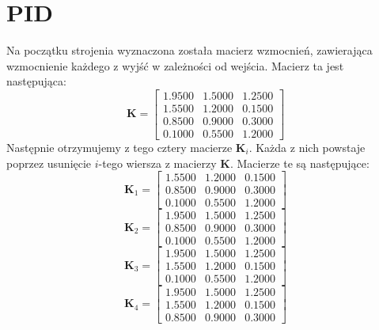 \chapter{PID}
Na początku strojenia wyznaczona została macierz wzmocnień, zawierająca
wzmocnienie każdego z wyjść w zależności od wejścia. Macierz ta jest następująca:
\begin{equation}
  \bm{K} =
  \begin{bmatrix}
    \num{1,9500}  &  \num{1,5000}  &  \num{1,2500} \\
    \num{1,5500}  &  \num{1,2000}  &  \num{0,1500} \\
    \num{0,8500}  &  \num{0,9000}  &  \num{0,3000} \\
    \num{0,1000} &   \num{0,5500}  &  \num{1,2000}
  \end{bmatrix}
\end{equation}
Następnie otrzymujemy z tego cztery macierze $\bm{K}_i$. Każda z nich powstaje poprzez
usunięcie $i$-tego wiersza z macierzy $\bm{K}$. Macierze te są następujące:
\begin{equation}
  \bm{K}_1 =
  \begin{bmatrix}
    \num{1,5500}   & \num{1,2000} &   \num{0,1500} \\
        \num{0,8500}   & \num{0,9000} &   \num{0,3000} \\
        \num{0,1000}   & \num{0,5500}  &  \num{1,2000}
  \end{bmatrix}
\end{equation}
\begin{equation}
  \bm{K}_2 =
  \begin{bmatrix}
    \num{1,9500} &   \num{1,5000} &   \num{1,2500} \\
       \num{0,8500}   & \num{0,9000} &   \num{0,3000} \\
       \num{0,1000}   & \num{0,5500} &   \num{1,2000}
  \end{bmatrix}
\end{equation}
\begin{equation}
  \bm{K}_3 =
  \begin{bmatrix}
    \num{1,9500} &   \num{1,5000} &   \num{1,2500} \\
       \num{1,5500}   & \num{1,2000} &   \num{0,1500} \\
       \num{0,1000}   & \num{0,5500}  &  \num{1,2000}
  \end{bmatrix}
\end{equation}
\begin{equation}
  \bm{K}_4 =
  \begin{bmatrix}
    \num{1,9500}  &  \num{1,5000}  &  \num{1,2500} \\
    \num{1,5500}  &  \num{1,2000}  &  \num{0,1500} \\
    \num{0,8500}  &  \num{0,9000}  &  \num{0,3000}
  \end{bmatrix}
\end{equation}
